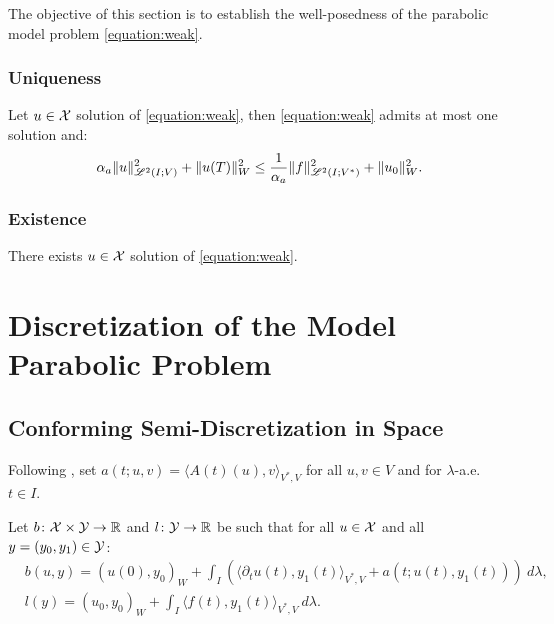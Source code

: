 The objective of this section is to establish the well-posedness of the parabolic model problem \cref{equation:weak}.

\subsubsection{Uniqueness}

\begin{lemma}
    Let $u \in \mathcal{X}$ solution of \cref{equation:weak}, then \cref{equation:weak} admits at most one solution and:
    \begin{gather}
        \alpha_{a} \lVert u \rVert_{\mathscr{L}^{2}(I; V)}^2 + \lVert u(T) \rVert_W^2 \leq \frac{1}{\alpha_{a}} \lVert f \rVert_{\mathscr{L}^{2}(I; V^*)}^2 + \lVert u_0 \rVert_W^2.
    \end{gather}
\end{lemma}



\subsubsection{Existence}

\begin{lemma}[Existence]
    There exists $u \in \mathcal{X}$ solution of \cref{equation:weak}.
\end{lemma}


\newpage
\section{Discretization of the Model Parabolic Problem}

\subsection{Conforming Semi-Discretization in Space}

Following \cite[p. 135]{Ern2021}, set $a(t; u, v) = \langle A(t)(u), v \rangle_{V^*, V}$ for all $u, v \in V$ and for $\lambda$-a.e. $t \in I$.

\begin{definition}[$b$ and $l$]
    Let $b \colon \mathcal{X} \times \mathcal{Y} \rightarrow \mathbb{R}$ and $l \colon \mathcal{Y} \rightarrow \mathbb{R}$ be such that for all $u \in \mathcal{X}$ and all $y = (y_0, y_1) \in \mathcal{Y}$:
    \begin{align}
        & b(u, y) = \left( u(0), y_0 \right)_W + \int_I \left( \langle \partial_t u(t), y_1(t) \rangle_{V^*, V} + a(t; u(t), y_1(t)) \right)~ d \lambda, \\
        & l(y) = \left( u_0, y_0 \right)_W + \int_I \langle f(t), y_1(t) \rangle_{V^*, V} ~ d \lambda.
    \end{align}
\end{definition}

